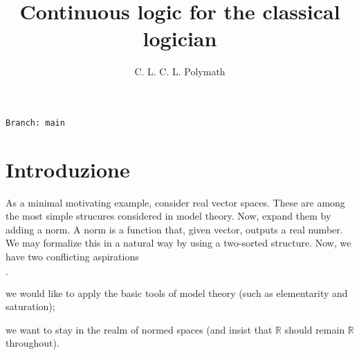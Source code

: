 \documentclass[11pt,oneside]{amsart}
\author{C. L. C. L. Polymath}
\newcommand{\mylabel}[1]{{#1}\hfill}
\renewenvironment{itemize}
  {\begin{list}{$\cdot$}{%
  \setlength{\parskip}{0mm}
  \setlength{\topsep}{.2\baselineskip}
  \setlength{\rightmargin}{0mm}
  \setlength{\listparindent}{0mm}
  \setlength{\itemindent}{0mm}
  \setlength{\labelwidth}{3ex}
  \setlength{\itemsep}{.2\baselineskip}
  \setlength{\parsep}{.2\baselineskip}
  \setlength{\partopsep}{0mm}
  \setlength{\labelsep}{1ex}
  \setlength{\leftmargin}{\labelwidth+\labelsep}
  \let\makelabel\mylabel}}{%
\end{list}}
\begin{document}
\title{Continuous logic for the classical logician}
\hfill\texttt{Branch:\ main\ \DTMnow}\bigskip
\maketitle
\raggedbottom


\newcommand\dangersign[1][2ex]{%
  \renewcommand\stacktype{L}%
  \scaleto{\stackon[-.6pt]{\color{red}$\triangle$}{\color{red}\bfseries\small ?}}{#1}%
}


\section{Introduzione}\label{intro}



\def\ceq#1#2#3{\parbox[t]{23ex}{$\displaystyle #1$}\parbox{6ex}{\hfil $#2$}{$\displaystyle #3$}}

As a minimal motivating example, consider real vector spaces.
These are among the most simple strucures considered in model theory.
Now, expand them by adding a norm.
A norm is a function that, given vector, outputs a real number.
We may formalize this in a natural way by using a two-sorted structure.
Now, we have two conflicting aspirations
\begin{itemize}
  \item[i.] we would like to apply the basic tools of model theory (such as elementarity and saturation);
  \item[ii.] we want to stay in the realm of normed spaces (and insist that 
  $\mathds{R}$ should remain $\mathds{R}$ throughout).
\end{itemize}
\end{document}
